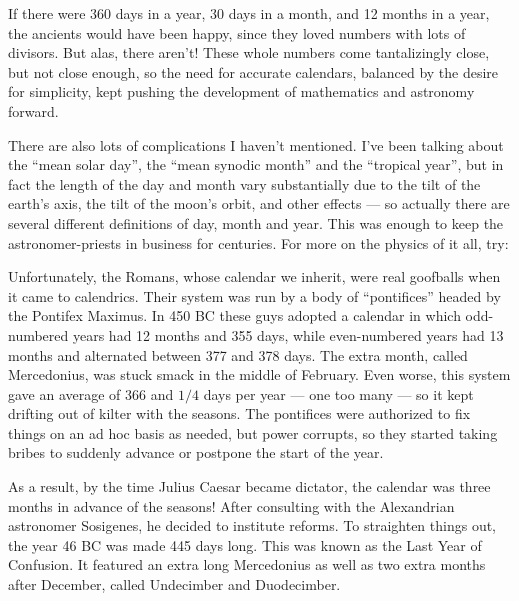 \documentclass{article}
\def\tightlist{}
\renewcommand{\texttt}[1]{%
  \begingroup
  \ttfamily
  \begingroup\lccode`~=`/\lowercase{\endgroup\def~}{/\discretionary{}{}{}}%
  \begingroup\lccode`~=`[\lowercase{\endgroup\def~}{[\discretionary{}{}{}}%
  \begingroup\lccode`~=`.\lowercase{\endgroup\def~}{.\discretionary{}{}{}}%
  \catcode`/=\active\catcode`[=\active\catcode`.=\active
  \scantokens{#1\noexpand}%
  \endgroup
}
\begin{document}
If there were 360 days in a year, 30 days in a month, and 12 months in a
year, the ancients would have been happy, since they loved numbers with
lots of divisors. But alas, there aren't! These whole numbers come
tantalizingly close, but not close enough, so the need for accurate
calendars, balanced by the desire for simplicity, kept pushing the
development of mathematics and astronomy forward.

There are also lots of complications I haven't mentioned. I've been
talking about the ``mean solar day'', the ``mean synodic month'' and the
``tropical year'', but in fact the length of the day and month vary
substantially due to the tilt of the earth's axis, the tilt of the
moon's orbit, and other effects --- so actually there are several
different definitions of day, month and year. This was enough to keep
the astronomer-priests in business for centuries. For more on the
physics of it all, try:


Unfortunately, the Romans, whose calendar we inherit, were real
goofballs when it came to calendrics. Their system was run by a body of
``pontifices'' headed by the Pontifex Maximus. In 450 BC these guys
adopted a calendar in which odd-numbered years had 12 months and 355
days, while even-numbered years had 13 months and alternated between 377
and 378 days. The extra month, called Mercedonius, was stuck smack in
the middle of February. Even worse, this system gave an average of 366
and \(1/4\) days per year --- one too many --- so it kept drifting out
of kilter with the seasons. The pontifices were authorized to fix things
on an ad hoc basis as needed, but power corrupts, so they started taking
bribes to suddenly advance or postpone the start of the year.

As a result, by the time Julius Caesar became dictator, the calendar was
three months in advance of the seasons! After consulting with the
Alexandrian astronomer Sosigenes, he decided to institute reforms. To
straighten things out, the year 46 BC was made 445 days long. This was
known as the Last Year of Confusion. It featured an extra long
Mercedonius as well as two extra months after December, called
Undecimber and Duodecimber.
\end{document}
